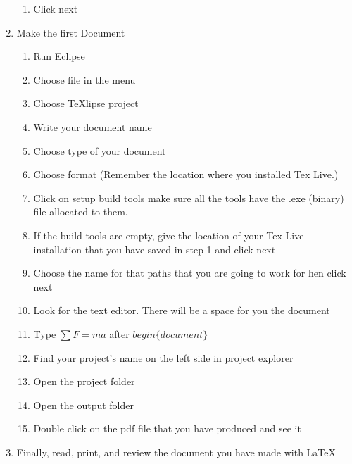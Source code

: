 \documentclass{memoir}
\begin{document}
\begin{enumerate}
\begin{enumerate}
    \item Click next
  \end{enumerate}
  \item Make the first Document
  \begin{enumerate}
    \item Run Eclipse
    \item Choose file in the menu 
    \item Choose TeXlipse project
    \item Write your document name
    \item Choose type of your document
    \item Choose format (Remember the location where you installed Tex Live.) 
    \item Click on setup build tools make sure all the tools have the .exe (binary) file allocated to them.
    \item If the build tools are empty, give the location of your Tex Live installation that you have saved in step 1 and click next
    \item Choose the name for that paths that you are going to work for hen click next
	\item Look for the text editor. There will be a space for you the document
    \item Type $\sum F = ma$ after $begin\{document\}$  
    \item Find your project's name on the left side in project explorer
    \item Open the project folder
    \item Open the output folder
    \item Double click on the pdf file that you have produced and see it    
  \end{enumerate}
  
  \item Finally, read, print, and review the document you have made with \LaTeX
\end{enumerate}
\end{document}
